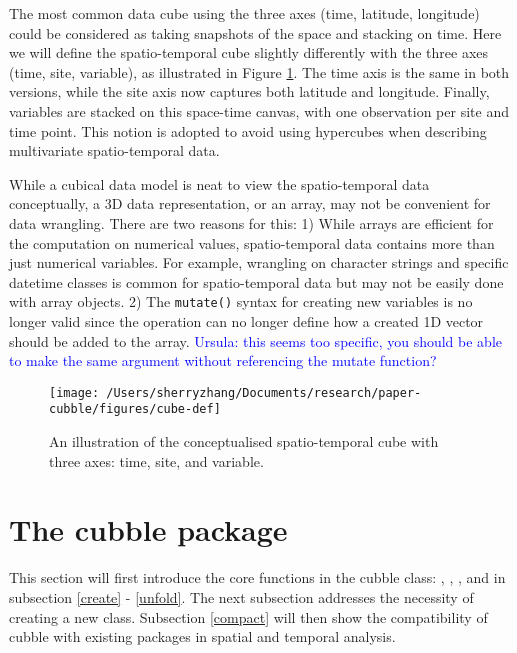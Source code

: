 \documentclass{article}
\begin{document}
The most common data cube using the three axes (time, latitude, longitude) could be considered as taking snapshots of the space and stacking on time. Here we will define the spatio-temporal cube slightly differently with the three axes (time, site, variable), as illustrated in Figure \ref{fig:cube-def}. The time axis is the same in both versions, while the site axis now captures both latitude and longitude. Finally, variables are stacked on this space-time canvas, with one observation per site and time point. This notion is adopted to avoid using hypercubes when describing multivariate spatio-temporal data.

While a cubical data model is neat to view the spatio-temporal data conceptually, a 3D data representation, or an array, may not be convenient for data wrangling. There are two reasons for this: 1) While arrays are efficient for the computation on numerical values, spatio-temporal data contains more than just numerical variables. For example, wrangling on character strings and specific datetime classes is common for spatio-temporal data but may not be easily done with array objects. 2) The \texttt{mutate()} syntax for creating new variables is no longer valid since the operation can no longer define how a created 1D vector should be added to the array.
\textcolor{blue}{Ursula: this seems too specific, you should be able to make the same argument without referencing the mutate function?}

\begin{figure}

{\centering \texttt{[image: /Users/sherryzhang/Documents/research/paper-cubble/figures/cube-def]} 

}

\caption{An illustration of the conceptualised spatio-temporal cube with three axes: time, site, and variable.}\label{fig:cube-def}
\end{figure}

\hypertarget{cubble}{%
\section{The cubble package}\label{cubble}}

This section will first introduce the core functions in the cubble class: , , , and  in subsection \ref{create} - \ref{unfold}. The next subsection addresses the necessity of creating a new class. Subsection \ref{compact} will then show the compatibility of cubble with existing packages in spatial and temporal analysis.
\end{document}
